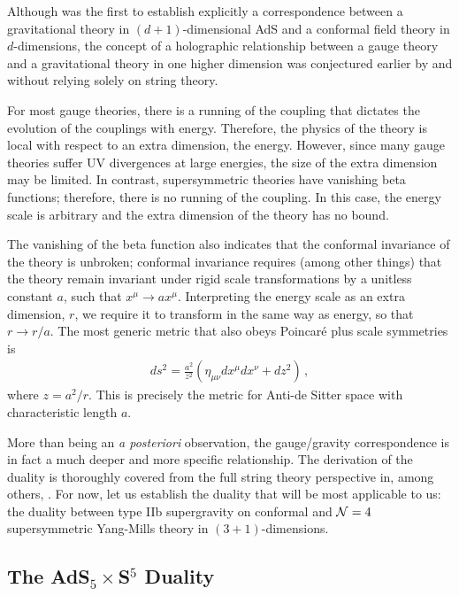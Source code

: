 \documentclass[../PhD.tex]{subfiles}
\begin{document}
Although \cite{hep-th/9711200} was the first to establish explicitly a correspondence between a gravitational theory in $(d+1)$-dimensional AdS and a conformal field theory in $d$-dimensions, the concept of a holographic relationship between a gauge theory and a gravitational theory in one higher dimension was conjectured earlier by \cite{gr-qc/9310026} and \cite{hep-th/9409089} without relying solely on string theory. 

For most gauge theories, there is a running of the coupling that dictates the evolution of the couplings with energy. Therefore, the physics of the theory is local with respect to an extra dimension, the energy. However, since many gauge theories suffer UV divergences at large energies, the size of the extra dimension may be limited. In contrast, supersymmetric theories have vanishing beta functions; therefore, there is no running of the coupling. In this case, the energy scale is arbitrary and the extra dimension of the theory has no bound.

The vanishing of the beta function also indicates that the conformal invariance of the theory is unbroken; conformal invariance requires (among other things) that the theory remain invariant under rigid scale transformations by a unitless constant $a$, such that $x^\mu \to a x^\mu$. Interpreting the energy scale as an extra dimension, $r$, we require it to transform in the same way as energy, so that $r \to r/ a$. The most generic metric that also obeys Poincar\'e plus scale symmetries is
\begin{align}
\label{Poincare ads}
ds^2 = \frac{a^2}{z^2} \left( \eta_{\mu \nu}dx^\mu dx^\nu +dz^2 \right) \, ,
\end{align}
where $z = a^2 / r$. This is precisely the metric for Anti-de Sitter space with characteristic length $a$. 

More than being an \emph{a posteriori} observation, the gauge/gravity correspondence is in fact a much deeper and more specific relationship. The derivation of the duality is thoroughly covered from the full string theory perspective in, among others, \cite{hep-th/9711200, gr-qc/0602037, hep-th/9902131, hep-th/9905111}. For now, let us establish the duality that will be most applicable to us: the duality between type IIb supergravity on conformal \ads and $\mathcal N = 4$ supersymmetric Yang-Mills theory in $(3+1)$-dimensions.


\subsection{The AdS$_5 \times$S$^5$ Duality}
\label{ssec: AdS5xS5}
\end{document}
